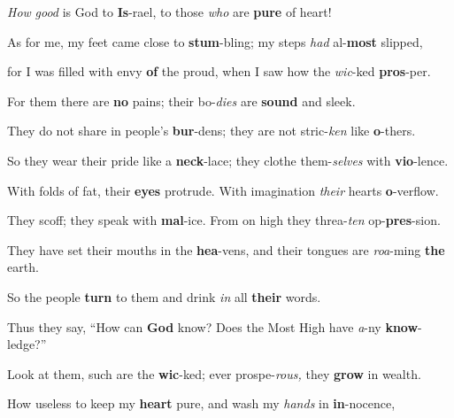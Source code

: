 \item \textit{How} \textit{good} is God to \textbf{Is}-rael, \mediant
 to those \textit{who} are \textbf{pure} of heart! 

\item As for me, my feet came close to \textbf{stum}-bling; \mediant
 my steps \textit{had} al-\textbf{most} slipped, 

\item for I was filled with envy \textbf{of} the proud, \mediant
 when I saw how the \textit{wic}-ked \textbf{pros}-per. 

\item For them there are \textbf{no} pains; \mediant
 their bo-\textit{dies} are \textbf{sound} and sleek. 

\item They do not share in people’s \textbf{bur}-dens; \mediant
 they are not stric-\textit{ken} like \textbf{o}-thers. 

\item So they wear their pride like a \textbf{neck}-lace; \mediant
 they clothe them-\textit{selves} with \textbf{vio}-lence. 

\item With folds of fat, their \textbf{eyes} protrude. \mediant
 With imagination \textit{their} hearts \textbf{o}-verflow. 

\item They scoff; they speak with \textbf{mal}-ice. \mediant
 From on high they threa-\textit{ten} op-\textbf{pres}-sion. 

\item They have set their mouths in the \textbf{hea}-vens, \mediant
 and their tongues are \textit{roa}-ming \textbf{the} earth. 

\item So the people \textbf{turn} to them \mediant
 and drink \textit{in} all \textbf{their} words. 

\item Thus they say, “How can \textbf{God} know? \mediant
 Does the Most High have \textit{a}-ny \textbf{know}-ledge?” 

\item Look at them, such are the \textbf{wic}-ked; \mediant
 ever prospe-\textit{rous,} they \textbf{grow} in wealth. 

\item How useless to keep my \textbf{heart} pure, \mediant
 and wash my \textit{hands} in \textbf{in}-nocence, 

